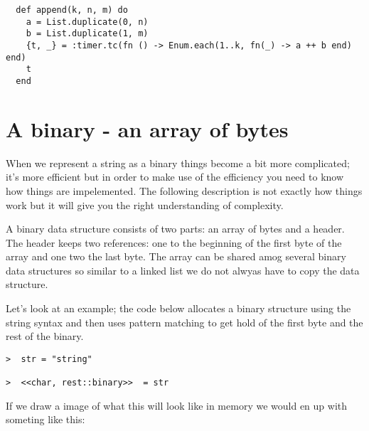 \documentclass[a4paper,11pt]{article}
\begin{document}
\begin{verbatim}
  def append(k, n, m) do
    a = List.duplicate(0, n)
    b = List.duplicate(1, m)
    {t, _} = :timer.tc(fn () -> Enum.each(1..k, fn(_) -> a ++ b end) end)
    t
  end
\end{verbatim}
  

\section{A binary - an array of bytes}

When we represent a string as a binary things become a bit more
complicated; it's more efficient but in order to make use of the
efficiency you need to know how things are impelemented. The following
description is not exactly how things work but it will give you the
right understanding of complexity.

A binary data structure consists of two parts: an array of bytes and a
header. The header keeps two references: one to the beginning of the
first byte of the array and one two the last byte. The array can be
shared amog several binary data structures so similar to a linked list
we do not alwyas have to copy the data structure.

Let's look at an example; the code below allocates a binary structure
using the string syntax and then uses pattern matching to get hold of
the first byte and the rest of the binary.

\begin{verbatim}
>  str = "string"

>  <<char, rest::binary>>  = str

\end{verbatim}

If we draw a image of what this will look like in memory we would en up with someting like this:

\end{document}
